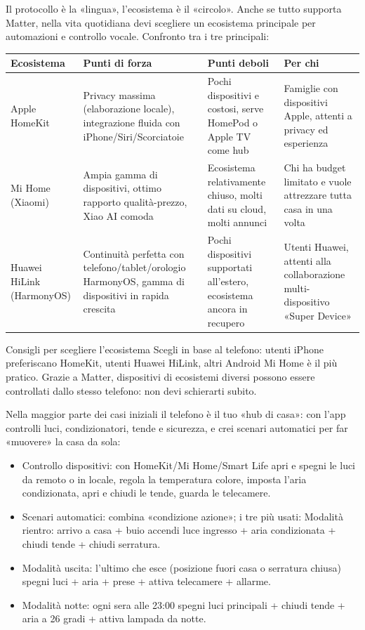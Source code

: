 
Il protocollo è la «lingua», l'ecosistema è il «circolo». Anche se tutto supporta Matter, nella vita quotidiana devi scegliere un ecosistema principale per automazioni e controllo vocale. Confronto tra i tre principali:

\begin{center}
\begin{tabularx}{\linewidth}{|X|X|X|X|}
\hline
\textbf{Ecosistema} & \textbf{Punti di forza} & \textbf{Punti deboli} & \textbf{Per chi} \tabularnewline
\hline
Apple HomeKit & Privacy massima (elaborazione locale), integrazione fluida con iPhone/Siri/Scorciatoie & Pochi dispositivi e costosi, serve HomePod o Apple TV come hub & Famiglie con dispositivi Apple, attenti a privacy ed esperienza \tabularnewline
Mi Home (Xiaomi) & Ampia gamma di dispositivi, ottimo rapporto qualità-prezzo, Xiao AI comoda & Ecosistema relativamente chiuso, molti dati su cloud, molti annunci & Chi ha budget limitato e vuole attrezzare tutta casa in una volta \tabularnewline
Huawei HiLink (HarmonyOS) & Continuità perfetta con telefono/tablet/orologio HarmonyOS, gamma di dispositivi in rapida crescita & Pochi dispositivi supportati all'estero, ecosistema ancora in recupero & Utenti Huawei, attenti alla collaborazione multi-dispositivo «Super Device» \tabularnewline
\hline
\end{tabularx}
\end{center}

\begin{tcbinfo}{Consigli per scegliere l'ecosistema}
Scegli in base al telefono: utenti iPhone preferiscano HomeKit, utenti Huawei HiLink, altri Android Mi Home è il più pratico. Grazie a Matter, dispositivi di ecosistemi diversi possono essere controllati dallo stesso telefono: non devi schierarti subito.

\end{tcbinfo}


Nella maggior parte dei casi iniziali il telefono è il tuo «hub di casa»: con l'app controlli luci, condizionatori, tende e sicurezza, e crei scenari automatici per far «muovere» la casa da sola:

\begin{itemize}
  \item Controllo dispositivi: con HomeKit/Mi Home/Smart Life apri e spegni le luci da remoto o in locale, regola la temperatura colore, imposta l'aria condizionata, apri e chiudi le tende, guarda le telecamere.
  \item Scenari automatici: combina «condizione azione»; i tre più usati: Modalità rientro: arrivo a casa + buio accendi luce ingresso + aria condizionata + chiudi tende + chiudi serratura.
  \item Modalità uscita: l'ultimo che esce (posizione fuori casa o serratura chiusa) spegni luci + aria + prese + attiva telecamere + allarme.
  \item Modalità notte: ogni sera alle 23:00 spegni luci principali + chiudi tende + aria a 26 gradi + attiva lampada da notte.
\end{itemize}

